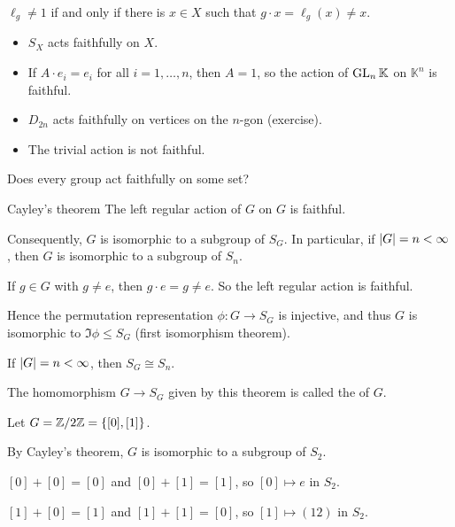 \documentclass[12pt,letterpaper]{report}
\begin{document}
\begin{thmproof}
  $\ell_g \neq 1$ if and only if there is $x \in X$ such that $g \cdot x = \ell_g(x) \neq x$.
\end{thmproof}

\begin{ex}
  \begin{itemize}
    \item $S_X$ acts faithfully on $X$.
    \item If $A \cdot e_i = e_i$ for all $i = 1, \ldots, n$, then $A = 1$, so the action of
      $\operatorname{GL}_n\mathbb{K}$ on $\mathbb{K}^n$ is faithful.
    \item $D_{2n}$ acts faithfully on vertices on the $n$-gon (exercise).
    \item The trivial action is not faithful.
  \end{itemize}
\end{ex}

Does every group act faithfully on some set?

\begin{thm}{Cayley's theorem}{}
  The left regular action of $G$ on $G$ is faithful.

  Consequently, $G$ is isomorphic to a subgroup of $S_G$.
  In particular, if $\lvert G\rvert = n < \infty$, then $G$ is isomorphic to a subgroup of $S_n$.
\end{thm}

\begin{thmproof}
  If $g \in G$ with $g \neq e$, then $g \cdot e = g \neq e$.
  So the left regular action is faithful.

  Hence the permutation representation $\phi \colon G \to S_G$ is injective, and thus $G$ is
  isomorphic to $\Im\phi \leq S_G$ (first isomorphism theorem).

  If $\lvert G\rvert = n < \infty$, then $S_G \cong S_n$.
\end{thmproof}

The homomorphism $G \to S_G$ given by this theorem is called the 
of $G$.

\begin{ex}
  Let $G = \mathbb{Z}/{2}\mathbb{Z} = \{[0], [1]\}$.

  By Cayley's theorem, $G$ is isomorphic to a subgroup of $S_2$.

  $[0] + [0] = [0]$ and $[0] + [1] = [1]$, so $[0] \mapsto e$ in $S_2$.

  $[1] + [0] = [1]$ and $[1] + [1] = [0]$, so $[1] \mapsto (12)$ in $S_2$.
\end{ex}
\end{document}
